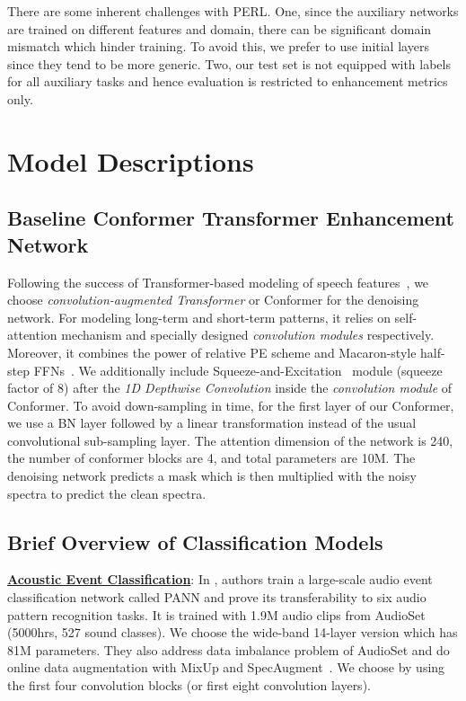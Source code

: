 \documentclass{article}
\begin{document}
There are some inherent challenges with \ac{PERL}.
One, since the auxiliary networks are trained on different features and domain, there can be significant domain mismatch which hinder training.
To avoid this, we prefer to use initial layers since they tend to be more generic.
Two, our test set is not equipped with labels for all auxiliary tasks and hence evaluation is restricted to enhancement metrics only.



\section{Model Descriptions}
\subsection{Baseline Conformer Transformer Enhancement Network}
Following the success of Transformer-based modeling of speech features~\cite{gulati2020conformer,kim2020t}, we choose \emph{convolution-augmented Transformer} or Conformer \cite{gulati2020conformer} for the denoising network.
For modeling long-term and short-term patterns, it relies on self-attention mechanism and specially designed \emph{convolution modules} respectively.
Moreover, it combines the power of relative \ac{PE} scheme and Macaron-style half-step \ac{FFNs}~\cite{gulati2020conformer}.
We additionally include Squeeze-and-Excitation~\cite{hu2018squeeze} module (squeeze factor of 8) after the \emph{1D Depthwise Convolution} inside the \emph{convolution module} of Conformer.
To avoid down-sampling in time, for the first layer of our Conformer, we use a \ac{BN} layer followed by a linear transformation instead of the usual convolutional sub-sampling layer.
The attention dimension of the network is 240, the number of conformer blocks are 4, and total parameters are 10M.
The denoising network predicts a mask which is then multiplied with the noisy spectra to predict the clean spectra.

\subsection{Brief Overview of Classification Models}
\underline{\textbf{Acoustic Event Classification}}: In \cite{kong2019panns}, authors train a large-scale audio event classification network called \ac{PANN} and prove its transferability to six audio pattern recognition tasks.
It is trained with 1.9M audio clips from AudioSet~\cite{gemmeke2017audio} (5000hrs, 527 sound classes).
We choose the wide-band 14-layer version
which has 81M parameters.
They also address data imbalance problem of AudioSet and do online data augmentation with MixUp and SpecAugment~\cite{park2019specaugment}.
We choose  by using the first four convolution blocks (or first eight convolution layers).
\end{document}
